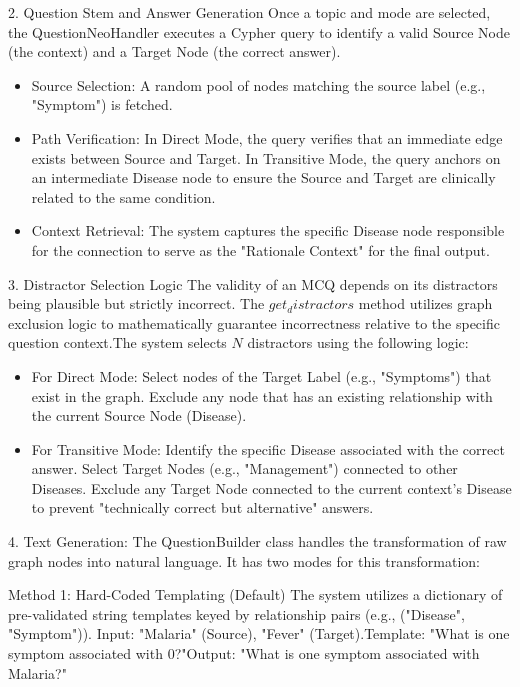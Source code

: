 2. Question Stem and Answer Generation
Once a topic and mode are selected, the QuestionNeoHandler executes a Cypher query to identify a valid Source Node (the context) and a Target Node (the correct answer).
\begin{itemize}
\item Source Selection: A random pool of nodes matching the source label (e.g., "Symptom") is fetched.
\item Path Verification: In Direct Mode, the query verifies that an immediate edge exists between Source and Target. In Transitive Mode, the query anchors on an intermediate Disease node to ensure the Source and Target are clinically related to the same condition.
\item Context Retrieval: The system captures the specific Disease node responsible for the connection to serve as the "Rationale Context" for the final output.
\end{itemize}

3. Distractor Selection Logic
The validity of an MCQ depends on its distractors being plausible but strictly incorrect. The $get_distractors$ method utilizes graph exclusion logic to mathematically guarantee incorrectness relative to the specific question context.The system selects $N$ distractors using the following logic:
\begin{itemize}
\item For Direct Mode: Select nodes of the Target Label (e.g., "Symptoms") that exist in the graph. Exclude any node that has an existing relationship with the current Source Node (Disease).

\item For Transitive Mode: Identify the specific Disease associated with the correct answer. Select Target Nodes (e.g., "Management") connected to other Diseases. Exclude any Target Node connected to the current context's Disease to prevent "technically correct but alternative" answers.
\end{itemize}

4. Text Generation: 
The QuestionBuilder class handles the transformation of raw graph nodes into natural language. It has two modes for this transformation:

Method 1: Hard-Coded Templating (Default)
The system utilizes a dictionary of pre-validated string templates keyed by relationship pairs (e.g., ("Disease", "Symptom")).
Input: "Malaria" (Source), "Fever" (Target).Template: "What is one symptom associated with {0}?"Output: "What is one symptom associated with Malaria?"

